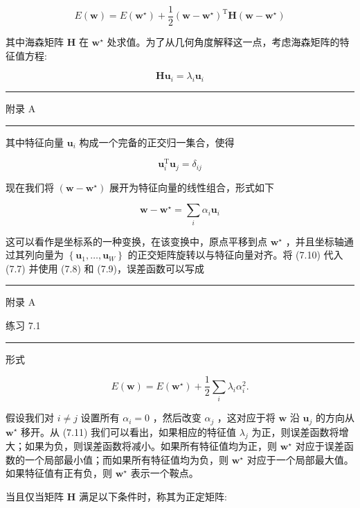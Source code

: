 \documentclass[10pt]{article}
\newcommand{\HRule}{\begin{center}\rule{0.9\linewidth}{0.2mm}\end{center}}
\begin{document}
\[
E\left( \mathbf{w}\right)  = E\left( {\mathbf{w}}^{ \star  }\right)  + \frac{1}{2}{\left( \mathbf{w} - {\mathbf{w}}^{ \star  }\right) }^{\mathrm{T}}\mathbf{H}\left( {\mathbf{w} - {\mathbf{w}}^{ \star  }}\right)  \tag{7.7}
\]

其中海森矩阵 \(\mathbf{H}\) 在 \({\mathbf{w}}^{ \star  }\) 处求值。为了从几何角度解释这一点，考虑海森矩阵的特征值方程:

\[
\mathbf{H}{\mathbf{u}}_{i} = {\lambda }_{i}{\mathbf{u}}_{i} \tag{7.8}
\]

\HRule

附录 A

\HRule

其中特征向量 \({\mathbf{u}}_{i}\) 构成一个完备的正交归一集合，使得

\[
{\mathbf{u}}_{i}^{\mathrm{T}}{\mathbf{u}}_{j} = {\delta }_{ij} \tag{7.9}
\]

现在我们将 \(\left( {\mathbf{w} - {\mathbf{w}}^{ \star  }}\right)\) 展开为特征向量的线性组合，形式如下

\[
\mathbf{w} - {\mathbf{w}}^{ \star  } = \mathop{\sum }\limits_{i}{\alpha }_{i}{\mathbf{u}}_{i} \tag{7.10}
\]

这可以看作是坐标系的一种变换，在该变换中，原点平移到点 \({\mathbf{w}}^{ \star  }\) ，并且坐标轴通过其列向量为 \(\left\{  {{\mathbf{u}}_{1},\ldots ,{\mathbf{u}}_{W}}\right\}\) 的正交矩阵旋转以与特征向量对齐。将 (7.10) 代入 (7.7) 并使用 (7.8) 和 (7.9)，误差函数可以写成

\HRule

附录 A

练习 7.1

\HRule

形式

\[
E\left( \mathbf{w}\right)  = E\left( {\mathbf{w}}^{ \star  }\right)  + \frac{1}{2}\mathop{\sum }\limits_{i}{\lambda }_{i}{\alpha }_{i}^{2}. \tag{7.11}
\]

假设我们对 \(i \neq  j\) 设置所有 \({\alpha }_{i} = 0\) ，然后改变 \({\alpha }_{j}\) ，这对应于将 \(\mathbf{w}\) 沿 \({\mathbf{u}}_{j}\) 的方向从 \({\mathbf{w}}^{ \star  }\) 移开。从 (7.11) 我们可以看出，如果相应的特征值 \({\lambda }_{j}\) 为正，则误差函数将增大；如果为负，则误差函数将减小。如果所有特征值均为正，则 \({\mathbf{w}}^{ \star  }\) 对应于误差函数的一个局部最小值；而如果所有特征值均为负，则 \({\mathbf{w}}^{ \star  }\) 对应于一个局部最大值。如果特征值有正有负，则 \({\mathbf{w}}^{ \star  }\) 表示一个鞍点。

当且仅当矩阵 \(\mathbf{H}\) 满足以下条件时，称其为正定矩阵:
\end{document}
